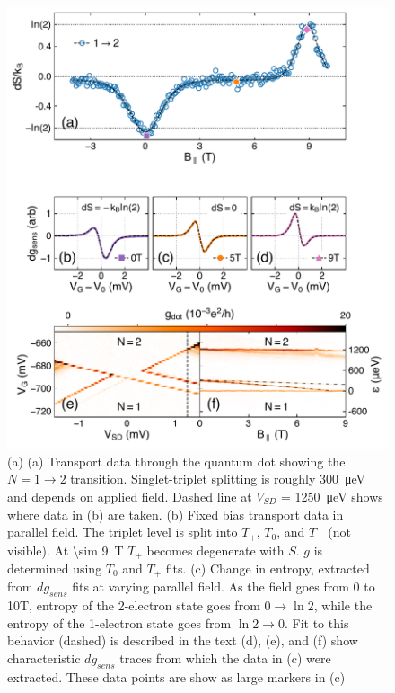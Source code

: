 \documentclass[preprint,showpacs,preprintnumbers,amsmath,amssymb,pra,aps,superscriptaddress]{revtex4-1}
\begin{document}
\begin{figure}
        \includegraphics[width=1.0\columnwidth]{../figures/figure_4.pdf}
        \caption{\label{fig:fig4}(a) (a) Transport data through the quantum dot showing the $N=1 \rightarrow 2$ transition. Singlet-triplet splitting is roughly \SI{300}{\micro\electronvolt} and depends on applied field. Dashed line at $V_{SD}$ = \SI{1250}{\micro\electronvolt} shows where data in (b) are taken. (b) Fixed bias transport data in parallel field. The triplet level is split into $T_+$, $T_0$, and $T_{-}$ (not visible). At \SI[input-protect-tokens]{\sim 9}{\tesla} $T_+$ becomes degenerate with $S$. $g$ is determined using $T_0$ and $T_+$ fits. (c) Change in entropy, extracted from $dg_{sens}$ fits at varying parallel field. As the field goes from 0 to 10T, entropy of the 2-electron state goes from $0  \rightarrow \ln{2}$, while the entropy of the 1-electron state goes from $\ln{2} \rightarrow 0$. Fit to this behavior (dashed) is described in the text (d), (e), and (f) show characteristic $dg_{sens}$ traces from which the data in (c) were extracted. These data points are show as large markers in (c)}
\end{figure}
\end{document}
